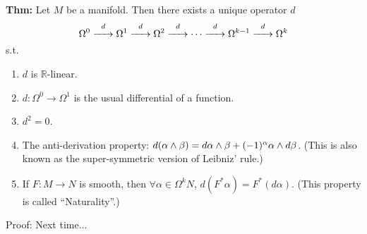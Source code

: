 \documentclass[10pt,letterpaper]{article}
\newcommand{\n}{\hfill\break}
\newcommand{\nn}{\vspace{0.5\baselineskip}\n}
\newcommand{\up}{\vspace{-\baselineskip}}
\newcommand{\hangblock}[2]{\par\noindent\settowidth{\hangindent}{\textbf{#1: }}\textbf{#1: }\nolinebreak#2}
\newcommand{\thm}[1]{\hangblock{Thm}{#1}}
\newcommand{\reals}{\mathbb{R}}
\newcommand{\R}{\reals}
\let\deg\relax
\DeclareMathOperator{\deg}{deg}
\newcommand{\st}{s.t.}
\begin{document}
\thm{
	Let $M$ be a manifold. Then there exists a unique operator $d$
	\[
		\Omega^{0}\overset{d}{\xrightarrow{\hspace{0.5cm}}}\Omega^{1}\overset{d}{\xrightarrow{\hspace{0.5cm}}}\Omega^{2}\overset{d}{\xrightarrow{\hspace{0.5cm}}}\cdots\overset{d}{\xrightarrow{\hspace{0.5cm}}}\Omega^{k-1}\overset{d}{\xrightarrow{\hspace{0.5cm}}}\Omega^{k}
	\]
	\st{}
	\begin{enumerate}[itemsep=0pt, topsep=0pt, leftmargin=4\parindent, label=(\arabic*)]
		\item $d$ is $\R$-linear.
		\item $d:\Omega^{0}\to\Omega^{1}$ is the usual differential of a function.
		\item $d^{2}=0$.
		\item The anti-derivation property: $d(\alpha\wedge\beta)=d\alpha\wedge\beta+(-1)^{\deg\alpha}\alpha\wedge{}d\beta$. (This is also known as the super-symmetric version of Leibniz' rule.)
		\item If $F:M\to{}N$ is smooth, then $\forall\alpha\in\Omega^{k}N$, $d(F^{*}\alpha)=F^{*}(d\alpha)$. (This property is called ``Naturality''.)
	\end{enumerate}\up\nn
	Proof: Next time...
}
\end{document}

